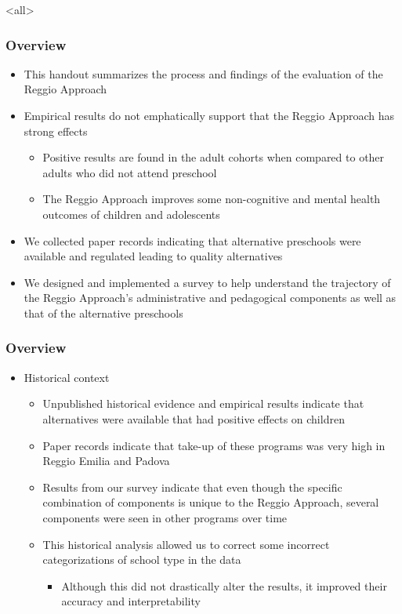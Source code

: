 \documentclass[static]{JJH-Beamer_PAGENOS}
\begin{document}

\mode<all>{\theTitlePages} %

\begin{frame}
\frametitle{Overview}
\begin{itemize}
\item This handout summarizes the process and findings of the evaluation of the Reggio Approach
\item Empirical results do not emphatically support that the Reggio Approach has strong effects
\begin{itemize}
	\item Positive results are found in the adult cohorts when compared to other adults who did not attend preschool
	\item The Reggio Approach improves some non-cognitive and mental health outcomes of children and adolescents
\end{itemize}
\item We collected paper records indicating that alternative preschools were available and regulated leading to quality alternatives
\item We designed and implemented a survey to help understand the trajectory of the Reggio Approach's administrative and pedagogical components as well as that of the alternative preschools
\end{itemize}

\end{frame}


\begin{frame}
\frametitle{Overview}
\begin{itemize}
	\item Historical context
	\begin{itemize}
		\item Unpublished historical evidence and empirical results indicate that alternatives were available that had positive effects on children
		\item Paper records indicate that take-up of these programs was very high in Reggio Emilia and Padova
		\item Results from our survey indicate that even though the specific combination of components is unique to the Reggio Approach, several components were seen in other programs over time
		\item This historical analysis allowed us to correct some incorrect categorizations of school type in the data
		\begin{itemize}
			\item Although this did not drastically alter the results, it improved their accuracy and interpretability
		\end{itemize}
	\end{itemize}
\end{itemize}
\end{frame}
\end{document}
